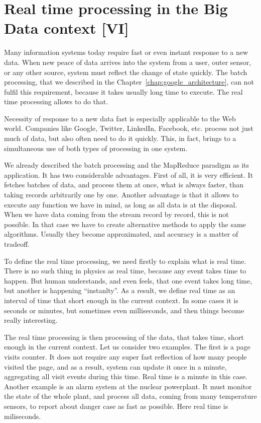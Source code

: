 \chapter{Real time processing in the Big Data context [VI]}
\label{chap:real_time_processing}

Many information systems today require fast or even instant response to a new data.
When new peace of data arrives into the system from a user, outer sensor, or any other source, system must reflect the change of state quickly. 
The batch processing, that we described in the Chapter~\ref{chap:google_architecture}, can not fulfil this requirement, because it takes usually long time to execute.
The real time processing allows to do that.

Necessity of response to a new data fast is especially applicable to the Web world.
Companies like Google, Twitter, LinkedIn, Facebook, etc. process not just much of data, but also often need to do it quickly.
This, in fact, brings to a simultaneous use of both types of processing in one system.

We already described the batch processing and the MapReduce paradigm as its application.
It has two considerable advantages.
First of all, it is very efficient.
It fetches batches of data, and process them at once, what is always faster, than taking records arbitrarily one by one.
Another advantage is that it allows to execute any function we have in mind, as long as all data is at the disposal.
When we have data coming from the stream record by record, this is not possible.
In that case we have to create alternative methods to apply the same algorithms.
Usually they become approximated, and accuracy is a matter of tradeoff.

To define the real time processing, we need firstly to explain what is real time.
There is no such thing in physics as real time, because any event takes time to happen.
But human understands, and even feels, that one event takes long time, but another is happening ``instanlty''.
As a result, we define real time as an interval of time that short enough in the current context.
In some cases it is seconds or minutes, but sometimes even milliseconds, and then things become really interesting.

The real time processing is then processing of the data, that takes time, short enough in the current context.
Let us consider two examples.
The first is a page visits counter.
It does not require any super fast reflection of how many people visited the page, and as a result, system can update it once in a minute, aggregating all visit events during this time.
Real time is a minute in this case.
Another example is an alarm system at the nuclear powerplant.
It must monitor the state of the whole plant, and process all data, coming from many temperature sensors, to report about danger case as fast as possible.
Here real time is miliseconds.

